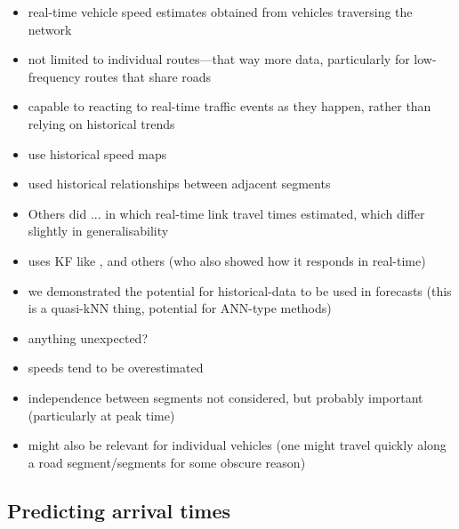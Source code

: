 \begin{itemize}
  \item real-time vehicle speed estimates obtained from vehicles traversing the network
  \item not limited to individual routes---that way more data, particularly for low-frequency routes that share roads
  \item capable to reacting to real-time traffic events as they happen, rather than relying on historical trends
  \item \citet{Celan_2018,Celan_2017} use historical speed maps
  \item \citet{Julio_2016} used historical relationships between adjacent segments
  \item Others did ... in which real-time link travel times estimated, which differ slightly in generalisability
  \item uses KF like \citet{Shalaby_2004}, and others (who also showed how it responds in real-time)
  \item we demonstrated the potential for historical-data to be used in forecasts (this is a quasi-kNN thing, potential for ANN-type methods)

  \item anything unexpected?
  \item speeds tend to be overestimated

  \item independence between segments not considered, but probably important (particularly at peak time)
  \item might also be relevant for individual vehicles (one might travel quickly along a road segment/segments for some obscure reason)
\end{itemize}


\subsection{Predicting arrival times}

